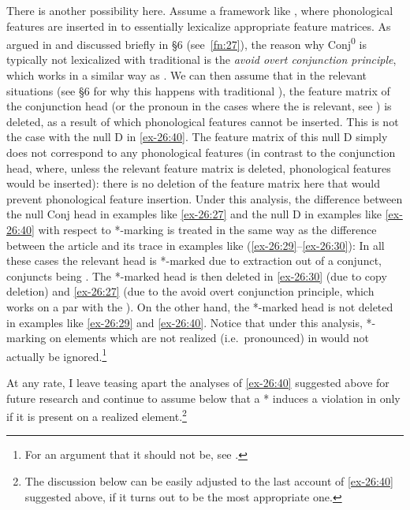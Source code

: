 \documentclass[output=paper]{langsci/langscibook}
\begin{document}
There is another possibility here. Assume a framework like , where phonological features are inserted in  to
essentially lexicalize appropriate feature matrices. As argued in
\textcite{Progovac1998,Progovac1999} and discussed briefly in §6
(see~\cref{fn:27}), the reason why Conj\textsuperscript{0} is typically not
lexicalized with traditional  is the \emph{avoid overt conjunction
principle}, which works in a similar way as  . We can then assume that in the relevant situations (see §6 for why
this happens with traditional ), the feature matrix of the
conjunction head (or the pronoun in the cases where the  is relevant, see \citealt{Holmberg2005}) is deleted, as a
result of which phonological features cannot be inserted. This is not the case
with the null D in \eqref{ex-26:40}. The feature matrix of this null D simply does not
correspond to any phonological features (in contrast to the conjunction head,
where, unless the relevant feature matrix is deleted, phonological features
would be inserted): there is no deletion of the feature matrix here that would
prevent phonological feature insertion.  Under this analysis, the difference
between the null Conj head in examples like \eqref{ex-26:27} and the null D in examples
like \eqref{ex-26:40} with respect to *-marking is treated in the same way as the
difference between the article and its trace in  examples like
(\ref{ex-26:29}--\ref{ex-26:30}): In all these cases the relevant head is *-marked due to extraction
out of a conjunct, conjuncts being .  The *-marked head is then deleted
in \eqref{ex-26:30} (due to copy deletion) and \eqref{ex-26:27} (due to the avoid overt conjunction
principle, which works on a par with the ).  On
the other hand, the *-marked head is not deleted in examples like \eqref{ex-26:29} and
\eqref{ex-26:40}.  Notice that under this analysis, *-marking on elements which are not
realized (i.e.\ pronounced) in  would not actually be
ignored.\footnote{For an argument that it should not be, see
\textcite{Boskovic2011}.}

At any rate, I leave teasing apart the analyses of \eqref{ex-26:40} suggested above for
future research and continue to assume below that a * induces a violation in
 only if it is present on a  realized
element.\footnote{The discussion below can be easily adjusted to the last
account of \eqref{ex-26:40} suggested above, if it turns out to be the most appropriate
one.}
\end{document}
